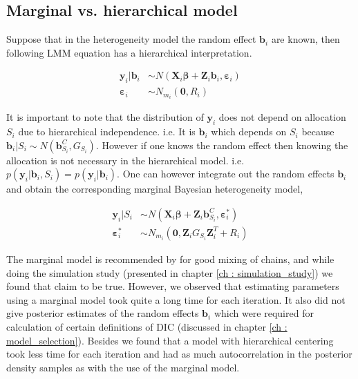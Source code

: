 \subsection{Marginal vs. hierarchical model}
Suppose that in the heterogeneity model the random effect $\boldsymbol{b}_i$ are known, then following LMM equation has a hierarchical interpretation.

\begin{equation}
\begin{split}
\boldsymbol{y}_i|\boldsymbol{b}_{i} &\sim N(\boldsymbol{X}_{i}\boldsymbol{\beta} + \boldsymbol{Z}_{i}\boldsymbol{b}_{i},\boldsymbol{\varepsilon}_{i})\\ 
\boldsymbol{\varepsilon}_{i} &\sim N_{m_i}(\boldsymbol{0}, R_i)
\end{split}
\end{equation}

It is important to note that the distribution of $\boldsymbol{y}_i$ does not depend on allocation $S_i$ due to hierarchical independence. i.e. It is $\boldsymbol{b}_{i}$ which depends on $S_i$ because $\boldsymbol{b}_{i}|S_i \sim N(\boldsymbol{b}_{S_i}^C, G_{S_i})$. However if one knows the random effect then knowing the allocation is not necessary in the hierarchical model. i.e. $p(\boldsymbol{y}_i|\boldsymbol{b}_{i}, S_i) = p(\boldsymbol{y}_i|\boldsymbol{b}_{i})$. One can however integrate out the random effects $\boldsymbol{b}_{i}$ and obtain the corresponding marginal Bayesian heterogeneity model,

\begin{equation}
\begin{split}
\boldsymbol{y}_i|S_i &\sim N(\boldsymbol{X}_{i}\boldsymbol{\beta} + \boldsymbol{Z}_{i}\boldsymbol{b}_{S_i}^C, \boldsymbol{\varepsilon}_{i}^*)\\ 
\boldsymbol{\varepsilon}_{i}^* &\sim N_{m_i}(\boldsymbol{0}, \boldsymbol{Z}_{i}G_{S_i}\boldsymbol{Z}_{i}^T+ R_i)
\end{split}
\end{equation}

The marginal model is recommended by \citet{fruhwirth-schnatter_bayesian_2004} for good mixing of chains, and while doing the simulation study (presented in chapter \ref{ch : simulation_study}) we found that claim to be true. However, we observed that estimating parameters using a marginal model took quite a long time for each iteration. It also did not give posterior estimates of the random effects $\boldsymbol{b}_i$ which were required for calculation of certain definitions of DIC (discussed in chapter \ref{ch : model_selection}). Besides we found that a model with hierarchical centering took less time for each iteration and had as much autocorrelation in the posterior density samples as with the use of the marginal model.


